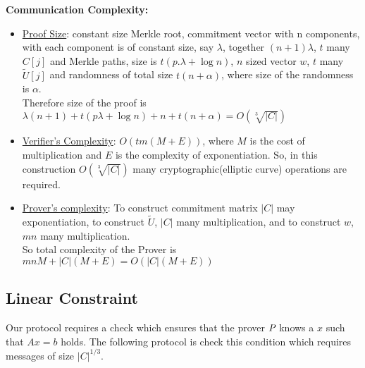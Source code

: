  
 \textbf{Communication Complexity:} 
 \begin{itemize}
 	\item \underline{Proof Size}: constant size Merkle root, commitment vector with n components, with each component is of constant size, say $\lambda$, together $(n+1)\lambda$, $t$ many $C[j]$ and Merkle paths, size is $t(p.\lambda + \log n)$, $n$ sized vector $w$, $t$ many $\widetilde{U}[j]$ and randomness of total size $t(n+\alpha)$, where size of the randomness is $\alpha$.\\
	Therefore size of the proof is $\lambda(n+1)+t(p\lambda+\log n)+n+t(n+\alpha)= O(\sqrt[3]{|C|})$
	\item \underline{Verifier's Complexity}: $O(tm(M+E))$, where $M$ is the cost of multiplication and $E$ is the complexity of exponentiation. So, in this construction $O(\sqrt[3]{|C|})$ many cryptographic(elliptic curve) operations are required.
	\item \underline{Prover's complexity}: To construct commitment matrix $|C|$ may exponentiation, to construct $\widetilde{U}$, $|C|$ many multiplication, and to construct $w$, $mn$ many multiplication.\\
	So total complexity of the Prover is $mnM+|C|(M+E)=O(|C|(M+E))$
  \end{itemize}
 
\subsection{Linear Constraint} Our protocol requires a check which ensures that the prover $\P$ knows a $x$ such that $Ax=b$ holds. The following protocol is check this condition which requires messages of size $|C|^{1/3}$.

